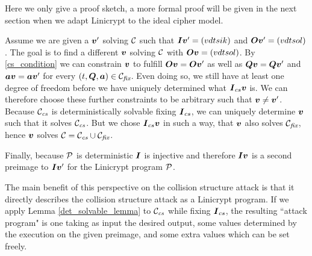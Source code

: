 Here we only give a proof sketch,
a more formal proof will be given in the next section when we adapt Linicrypt to the ideal cipher model.
\begin{sketch}
Assume we are given a $\vv'$ solving $\C$ such that $\I \vv' = \vec i k$ and $\O \vv' = \vec o l$.
The goal is to find a different $\vv$ solving $\C$ with $\O \vv = \vec o l$.
By \eqref{cs_condition} we can constrain $\vv$ to fulfill $\O \vv = \O \vv'$
as well as $\Q \vv = \Q \vv'$ and $\va\vv = \va\vv'$ for every $(t, \Q, \va) \in \Cfix$.
Even doing so, we still have at least one degree of freedom before we have uniquely determined what
$\I_{cs} \vv$ is.
We can therefore choose these further constraints to be arbitrary such that $\vv \neq \vv'$.
Because $\Ccs$ is deterministically solvable fixing $\I_{cs}$,
we can uniquely determine $\vv$ such that it solves $\Ccs$.
But we chose $\I_{cs} \vv$ in such a way, that $\vv$ also solves $\Cfix$,
hence $\vv$ solves $\C = \Ccs \cup \Cfix$.

Finally, because $\P$ is deterministic $\I$ is injective and therefore
$\I\vv$ is a second preimage to $\I\vv'$ for the Linicrypt program $\P$.
\end{sketch}

The main benefit of this perspective on the collision structure attack is
that it directly describes the collision structure attack as a Linicrypt program.
If we apply Lemma \ref{det_solvable_lemma} to $\Ccs$ while fixing $\I_{cs}$,
the resulting ``attack program" is one taking as input the desired output,
some values determined by the execution on the given preimage,
and some extra values which can be set freely.

